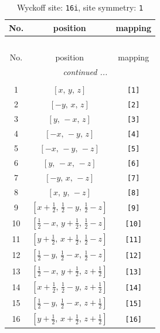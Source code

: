 \documentclass[fleqn,8pt]{jsarticle}
\begin{document}
\begin{longtable}{ccc}
\caption{Wyckoff site: {\tt 16i}, site symmetry: {\tt 1}}
 \\
 \hline \hline
No. & position & mapping \\ \hline \endfirsthead

\multicolumn{2}{l}{\tablename\ \thetable{}} \\
 \hline \hline
No. & position & mapping \\ \hline \endhead

 \hline \hline
\multicolumn{2}{r}{\footnotesize\it continued ...} \\ \endfoot

 \hline \hline
\multicolumn{2}{r}{} \\ \endlastfoot

1 & $\left[ x,\, y,\, z \right]$ & {\tt [1]} \\ \hline
2 & $\left[ - y,\, x,\, z \right]$ & {\tt [2]} \\ \hline
3 & $\left[ y,\, - x,\, z \right]$ & {\tt [3]} \\ \hline
4 & $\left[ - x,\, - y,\, z \right]$ & {\tt [4]} \\ \hline
5 & $\left[ - x,\, - y,\, - z \right]$ & {\tt [5]} \\ \hline
6 & $\left[ y,\, - x,\, - z \right]$ & {\tt [6]} \\ \hline
7 & $\left[ - y,\, x,\, - z \right]$ & {\tt [7]} \\ \hline
8 & $\left[ x,\, y,\, - z \right]$ & {\tt [8]} \\ \hline
9 & $\left[ x + \frac{1}{2},\, \frac{1}{2} - y,\, \frac{1}{2} - z \right]$ & {\tt [9]} \\ \hline
10 & $\left[ \frac{1}{2} - x,\, y + \frac{1}{2},\, \frac{1}{2} - z \right]$ & {\tt [10]} \\ \hline
11 & $\left[ y + \frac{1}{2},\, x + \frac{1}{2},\, \frac{1}{2} - z \right]$ & {\tt [11]} \\ \hline
12 & $\left[ \frac{1}{2} - y,\, \frac{1}{2} - x,\, \frac{1}{2} - z \right]$ & {\tt [12]} \\ \hline
13 & $\left[ \frac{1}{2} - x,\, y + \frac{1}{2},\, z + \frac{1}{2} \right]$ & {\tt [13]} \\ \hline
14 & $\left[ x + \frac{1}{2},\, \frac{1}{2} - y,\, z + \frac{1}{2} \right]$ & {\tt [14]} \\ \hline
15 & $\left[ \frac{1}{2} - y,\, \frac{1}{2} - x,\, z + \frac{1}{2} \right]$ & {\tt [15]} \\ \hline
16 & $\left[ y + \frac{1}{2},\, x + \frac{1}{2},\, z + \frac{1}{2} \right]$ & {\tt [16]} \\
\end{longtable}
\end{document}
